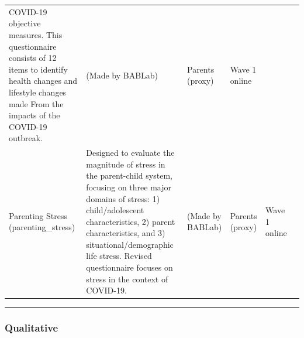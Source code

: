 \documentclass[
]{book}
\begin{document}
\begin{longtable}[]{@{}llllll@{}}
\begin{minipage}[t]{0.18\columnwidth}
COVID-19 objective measures. This questionnaire consists of 12 items to identify health changes and lifestyle changes made From the impacts of the COVID-19 outbreak.\strut
\end{minipage} & \begin{minipage}[t]{0.15\columnwidth}\raggedright
(Made by BABLab)\strut
\end{minipage} & \begin{minipage}[t]{0.16\columnwidth}\raggedright
Parents (proxy)\strut
\end{minipage} & \begin{minipage}[t]{0.06\columnwidth}\raggedright
Wave 1 online\strut
\end{minipage} & \begin{minipage}[t]{0.10\columnwidth}\raggedright
\strut
\end{minipage}\tabularnewline
\begin{minipage}[t]{0.18\columnwidth}\raggedright
Parenting Stress (parenting\_stress)\strut
\end{minipage} & \begin{minipage}[t]{0.18\columnwidth}\raggedright
Designed to evaluate the magnitude of stress in the parent-child system, focusing on three major domains of stress: 1) child/adolescent characteristics, 2) parent characteristics, and 3) situational/demographic life stress. Revised questionnaire focuses on stress in the context of COVID-19.\strut
\end{minipage} & \begin{minipage}[t]{0.15\columnwidth}\raggedright
(Made by BABLab)\strut
\end{minipage} & \begin{minipage}[t]{0.16\columnwidth}\raggedright
Parents (proxy)\strut
\end{minipage} & \begin{minipage}[t]{0.06\columnwidth}\raggedright
Wave 1 online\strut
\end{minipage} & \begin{minipage}[t]{0.10\columnwidth}\raggedright
\strut
\end{minipage}\tabularnewline
\bottomrule
\end{longtable}

\begin{center}\rule{0.5\linewidth}{0.5pt}\end{center}

\hypertarget{qualitative}{%
\subsubsection{Qualitative}\label{qualitative}}
\end{document}
